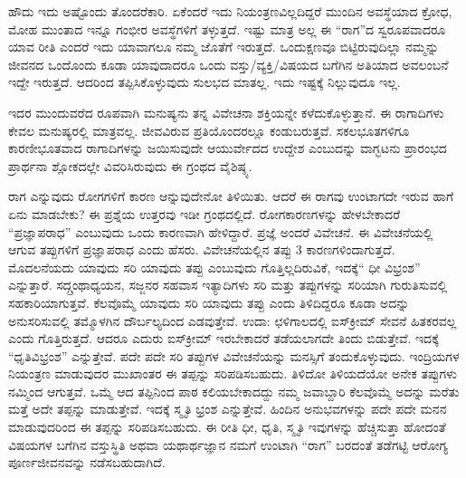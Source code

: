 {ಹೌದು ಇದು ಅಷ್ಟೊಂದು ತೊಂದರೆಕಾರಿ. ಏಕೆಂದರೆ ಇದು ನಿಯಂತ್ರಣವಿಲ್ಲದಿದ್ದರೆ  ಮುಂದಿನ ಅವಸ್ಥೆಯಾದ ಕ್ರೋಧ, ಮೋಹ ಮುಂತಾದ ಇನ್ನೂ ಗಂಭೀರ ಅವಸ್ಥೆಗಳಿಗೆ ತಳ್ಳುತ್ತದೆ. ಇಷ್ಟು ಮಾತ್ರ ಅಲ್ಲ ಈ “ರಾಗ”ದ ಸ್ವರೂಪವಾದರೂ ಯಾವ ರೀತಿ ಎಂದರೆ ಇದು ಯಾವಾಗಲೂ ನಮ್ಮ ಜೊತೆಗೆ ಇರುತ್ತದೆ. ಒಂದುಕ್ಷಣವೂ ಬಿಟ್ಟಿರುವುದಿಲ್ಲಾ ನಮ್ಮನ್ನು ಜೀವನದ ಒಂದೊಂದು ಕೂಡಾ ಯಾವುದಾದರೂ ಒಂದು ವಸ್ತು/ವ್ಯಕ್ತಿ/ವಿಷಯದ ಬಗೆಗಿನ ಅತಿಯಾದ ಅವಲಂಬನೆ ಇದ್ದೇ ಇರುತ್ತದೆ. ಆದರಿಂದ ತಪ್ಪಿಸಿಕೊಳ್ಳುವುದು ಸುಲಭದ ಮಾತಲ್ಲ. ಇದು ಇಷ್ಟಕ್ಕೆ ನಿಲ್ಲುವುದೂ ಇಲ್ಲ.

ಇದರ ಮುಂದುವರೆದ ರೂಪವಾಗಿ ಮನುಷ್ಯನು ತನ್ನ ವಿವೇಚನಾ ಶಕ್ತಿಯನ್ನೇ ಕಳೆದುಕೊಳ್ಳುತ್ತಾನೆ. ಈ ರಾಗಾದಿಗಳು ಕೇವಲ ಮನುಷ್ಯರಲ್ಲಿ ಮಾತ್ರವಲ್ಲ. ಜೀವವಿರುವ ಪ್ರತಿಯೊಂದರಲ್ಲೂ ಕಂಡುಬರುತ್ತವೆ.  ಸಕಲಭೂತಗಳಿಗೂ ಕಾರಣೀಭೂತವಾದ ರಾಗಾದಿಗಳನ್ನು ಜಯಿಸುವುದೇ ಆಯುರ್ವೇದದ ಉದ್ದೇಶ ಎಂಬುದನ್ನು ವಾಗ್ಭಟನು ಪ್ರಾರಂಭದ ಪ್ರಾರ್ಥನಾ ಶ್ಲೋಕದಲ್ಲೇ ವಿವರಿಸಿರುವುದು ಈ ಗ್ರಂಥದ ವೈಶಿಷ್ಠ್ಯ.

ರಾಗ ಎನ್ನುವುದು ರೋಗಗಳಿಗೆ ಕಾರಣ ಆನ್ನುವುದೇನೋ ತಿಳಿಯಿತು. ಆದರೆ ಈ ರಾಗವು ಉಂಟಾಗದೇ ಇರುವ ಹಾಗೆ ಏನು ಮಾಡಬೇಕು? ಈ ಪ್ರಶ್ನೆಯ ಉತ್ತರವು ಇಡೀ ಗ್ರಂಥದಲ್ಲಿದೆ. ರೋಗಕಾರಣಗಳನ್ನು ಹೇಳಬೇಕಾದರೆ “ಪ್ರಜ್ಞಾಪರಾಧ” ಎಂಬುವುದು ಒಂದು ಕಾರಣವಾಗಿ ಹೇಳಿದ್ದಾರೆ. ಪ್ರಜ್ಞೆ ಅಂದರೆ ವಿವೇಚನೆ. ಈ ವಿವೇಚನೆಯಲ್ಲಿ ಆಗುವ ತಪ್ಪುಗಳಿಗೆ ಪ್ರಜ್ಞಾಪರಾಧ ಎಂದು ಹೆಸರು. ವಿವೇಚನೆಯಲ್ಲಿನ ತಪ್ಪು 3 ಕಾರಣಗಳಿಂದಾಗುತ್ತದೆ. ಮೊದಲನೆಯದು ಯಾವುದು ಸರಿ ಯಾವುದು ತಪ್ಪು ಎಂಬುವುದು ಗೊತ್ತಿಲ್ಲದಿರುವಿಕೆ, ಇದಕ್ಕೆ“ ಧೀ ವಿಭ್ರಂಶ” ಎನ್ನುತ್ತಾರೆ. ಸದ್ಗ್ರಂಥಾಧ್ಯಯನ, ಸಜ್ಜನರ ಸಹವಾಸ ಇತ್ಯಾದಿಗಳು ಸರಿ ಮತ್ತು ತಪ್ಪುಗಳನ್ನು ಸರಿಯಾಗಿ ಗುರುತಿಸುವಲ್ಲಿ ಸಹಕಾರಿಯಾಗುತ್ತವೆ. ಕೆಲವೊಮ್ಮೆ ಯಾವುದು ಸರಿ ಯಾವುದು ತಪ್ಪು ಎಂದು ತಿಳಿದಿದ್ದರೂ ಕೂಡಾ ಅದನ್ನು ಅನುಸರಿಸುವಲ್ಲಿ ತಮ್ಮೊಳಗಿನ ದೌರ್ಬಲ್ಯದಿಂದ ಎಡವುತ್ತೇವೆ. ಉದಾ: ಛಳಿಗಾಲದಲ್ಲಿ  ಐಸ್‍ಕ್ರೀಮ್ ಸೇವನೆ ಹಿತಕರವಲ್ಲ ಎಂದು ಗೊತ್ತಿರುತ್ತದೆ. ಆದರೂ ಎದುರು ಐಸ್‍ಕ್ರೀಮ್ ಇರಬೇಕಾದರೆ ತಡೆಯಲಾಗದೇ ತಿಂದು ಬಿಡುತ್ತೇವೆ. ಇದಕ್ಕೆ “ಧೃತಿವಿಭ್ರಂಶ” ಎನ್ನುತ್ತೇವೆ. ಪದೇ ಪದೇ ಸರಿ ತಪ್ಪುಗಳ ವಿವೇಚನೆಯನ್ನು ಮನಸ್ಸಿಗೆ ತಂದುಕೊಳ್ಳುವುದು. ಇಂದ್ರಿಯಗಳ ನಿಯಂತ್ರಣ ಮಾಡುವುದರ ಮುಖಾಂತರ ಈ ತಪ್ಪನ್ನು ಸರಿಪಡಿಸಬಹುದು. ತಿಳಿದೋ ತಿಳಿಯದೆಯೋ ಅನೇಕ ತಪ್ಪುಗಳು ನಮ್ಮಿಂದ ಆಗುತ್ತವೆ. ಒಮ್ಮೆ ಆದ ತಪ್ಪಿನಿಂದ ಪಾಠ ಕಲಿಯಬೇಕಾದದ್ದು ನಮ್ಮ ಜವಾಬ್ದಾರಿ ಕೆಲವೊಮ್ಮೆ ಅದನ್ನು ಮರೆತು ಮತ್ತೆ ಅದೇ ತಪ್ಪನ್ನು ಮಾಡುತ್ತೇವೆ. ಇದಕ್ಕೆ ಸ್ಮೃತಿ ಭ್ರಂಶ ಎನ್ನುತ್ತೇವೆ. ಹಿಂದಿನ ಅನುಭವಗಳನ್ನು ಪದೇ ಪದೇ ಮನನ ಮಾಡುವುದರಿಂದ ಈ ತಪ್ಪನ್ನು ಸರಿಪಡಿಸಬಹುದು. ಈ ರೀತಿ ಧೀ, ಧೃತಿ, ಸ್ಮೃತಿ ಇವುಗಳನ್ನು ಹೆಚ್ಚಿಸುತ್ತಾ ಹೋದಂತೆ ವಿಷಯಗಳ ಬಗೆಗಿನ ವಸ್ತುಸ್ಥಿತಿ ಅಥವಾ ಯಥಾರ್ಥಜ್ಞಾನ ನಮಗೆ ಉಂಟಾಗಿ “ರಾಗ” ಬರದಂತೆ ತಡೆಗಟ್ಟಿ ಆರೋಗ್ಯ ಪೂರ್ಣಜೀವನವನ್ನು ನಡೆಸಬಹುದಾಗಿದೆ.

\articleend
}
